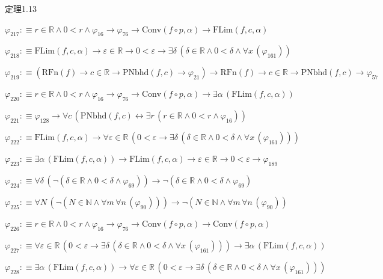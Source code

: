 \begin{fullproof}{定理1.13}
\begin{abbrevlist}
\item $\varphi_{217} :\equiv r \in \mathbb{R} \land 0 < r \land \varphi_{16} \to \varphi_{76} \to \mathrm{Conv}(f \circ p,\alpha) \to \mathrm{FLim}(f,c,\alpha)$
\item $\varphi_{218} :\equiv \mathrm{FLim}(f,c,\alpha) \to \varepsilon \in \mathbb{R} \to 0 < \varepsilon \to \exists \delta\,(\delta \in \mathbb{R} \land 0 < \delta \land \forall x\,(\varphi_{161}))$
\item $\varphi_{219} :\equiv (\mathrm{RFn}(f) \to c \in \mathbb{R} \to \mathrm{PNbhd}(f,c) \to \varphi_{21}) \to \mathrm{RFn}(f) \to c \in \mathbb{R} \to \mathrm{PNbhd}(f,c) \to \varphi_{57}$
\item $\varphi_{220} :\equiv r \in \mathbb{R} \land 0 < r \land \varphi_{16} \to \varphi_{76} \to \mathrm{Conv}(f \circ p,\alpha) \to \exists \alpha\,(\mathrm{FLim}(f,c,\alpha))$
\item $\varphi_{221} :\equiv \varphi_{128} \to \forall c\,(\mathrm{PNbhd}(f,c) \leftrightarrow \exists r\,(r \in \mathbb{R} \land 0 < r \land \varphi_{16}))$
\item $\varphi_{222} :\equiv \mathrm{FLim}(f,c,\alpha) \to \forall \varepsilon \in \mathbb{R}\,(0 < \varepsilon \to \exists \delta\,(\delta \in \mathbb{R} \land 0 < \delta \land \forall x\,(\varphi_{161})))$
\item $\varphi_{223} :\equiv \exists \alpha\,(\mathrm{FLim}(f,c,\alpha)) \to \mathrm{FLim}(f,c,\alpha) \to \varepsilon \in \mathbb{R} \to 0 < \varepsilon \to \varphi_{189}$
\item $\varphi_{224} :\equiv \forall \delta\,(\neg (\delta \in \mathbb{R} \land 0 < \delta \land \varphi_{69})) \to \neg (\delta \in \mathbb{R} \land 0 < \delta \land \varphi_{69})$
\item $\varphi_{225} :\equiv \forall N\,(\neg (N \in \mathbb{N} \land \forall m\,\forall n\,(\varphi_{90}))) \to \neg (N \in \mathbb{N} \land \forall m\,\forall n\,(\varphi_{90}))$
\item $\varphi_{226} :\equiv r \in \mathbb{R} \land 0 < r \land \varphi_{16} \to \varphi_{76} \to \mathrm{Conv}(f \circ p,\alpha) \to \mathrm{Conv}(f \circ p,\alpha)$
\item $\varphi_{227} :\equiv \forall \varepsilon \in \mathbb{R}\,(0 < \varepsilon \to \exists \delta\,(\delta \in \mathbb{R} \land 0 < \delta \land \forall x\,(\varphi_{161}))) \to \exists \alpha\,(\mathrm{FLim}(f,c,\alpha))$
\item $\varphi_{228} :\equiv \exists \alpha\,(\mathrm{FLim}(f,c,\alpha)) \to \forall \varepsilon \in \mathbb{R}\,(0 < \varepsilon \to \exists \delta\,(\delta \in \mathbb{R} \land 0 < \delta \land \forall x\,(\varphi_{161})))$

\end{abbrevlist}
\end{fullproof}
